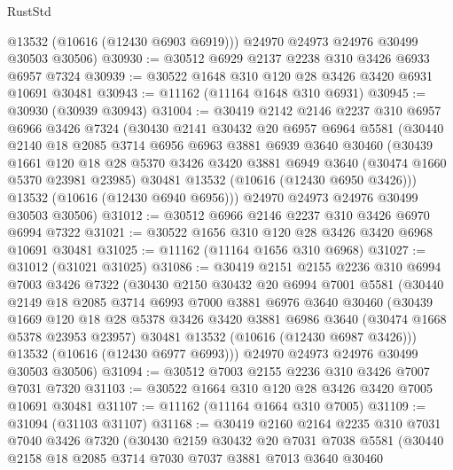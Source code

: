 \begin{lexlean}{RustStd}
\begin{coremodule}
        @13532
        (@10616 (@12430 @6903 @6919)))
      @24970
      @24973
      @24976
      @30499
      @30503
      @30506)
@30930 := @30512 @6929 @2137 @2238 @310 @3426 @6933 @6957 @7324
@30939 := @30522 @1648 @310 @120 @28 @3426 @3420 @6931 @10691 @30481
@30943 := @11162 (@11164 @1648 @310 @6931)
@30945 := @30930 (@30939 @30943)
@31004 := @30419
    @2142
    @2146
    @2237
    @310
    @6957
    @6966
    @3426
    @7324
    (@30430
      @2141
      @30432
      @20
      @6957
      @6964
      @5581
      (@30440
        @2140
        @18
        @2085
        @3714
        @6956
        @6963
        @3881
        @6939
        @3640
        @30460
        (@30439
          @1661
          @120
          @18
          @28
          @5370
          @3426
          @3420
          @3881
          @6949
          @3640
          (@30474 @1660 @5370 @23981 @23985)
          @30481
          @13532
          (@10616 (@12430 @6950 @3426)))
        @13532
        (@10616 (@12430 @6940 @6956)))
      @24970
      @24973
      @24976
      @30499
      @30503
      @30506)
@31012 := @30512 @6966 @2146 @2237 @310 @3426 @6970 @6994 @7322
@31021 := @30522 @1656 @310 @120 @28 @3426 @3420 @6968 @10691 @30481
@31025 := @11162 (@11164 @1656 @310 @6968)
@31027 := @31012 (@31021 @31025)
@31086 := @30419
    @2151
    @2155
    @2236
    @310
    @6994
    @7003
    @3426
    @7322
    (@30430
      @2150
      @30432
      @20
      @6994
      @7001
      @5581
      (@30440
        @2149
        @18
        @2085
        @3714
        @6993
        @7000
        @3881
        @6976
        @3640
        @30460
        (@30439
          @1669
          @120
          @18
          @28
          @5378
          @3426
          @3420
          @3881
          @6986
          @3640
          (@30474 @1668 @5378 @23953 @23957)
          @30481
          @13532
          (@10616 (@12430 @6987 @3426)))
        @13532
        (@10616 (@12430 @6977 @6993)))
      @24970
      @24973
      @24976
      @30499
      @30503
      @30506)
@31094 := @30512 @7003 @2155 @2236 @310 @3426 @7007 @7031 @7320
@31103 := @30522 @1664 @310 @120 @28 @3426 @3420 @7005 @10691 @30481
@31107 := @11162 (@11164 @1664 @310 @7005)
@31109 := @31094 (@31103 @31107)
@31168 := @30419
    @2160
    @2164
    @2235
    @310
    @7031
    @7040
    @3426
    @7320
    (@30430
      @2159
      @30432
      @20
      @7031
      @7038
      @5581
      (@30440
        @2158
        @18
        @2085
        @3714
        @7030
        @7037
        @3881
        @7013
        @3640
        @30460

\end{coremodule}
\end{lexlean}
